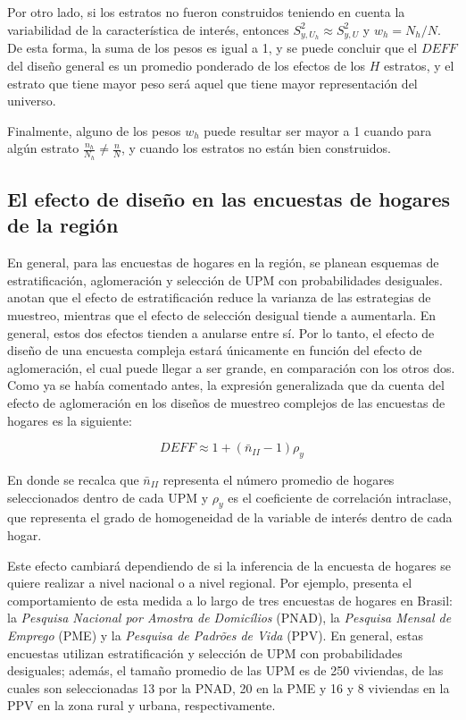 \documentclass[
  12pt,
  spanish,
]{book}
\begin{document}
Por otro lado, si los estratos no fueron construidos teniendo en cuenta la variabilidad de la característica de interés, entonces \(S_{y,U_h}^2\approx S_{y,U}^2\) y \(w_h=N_h/N\). De esta forma, la suma de los pesos es igual a 1, y se puede concluir que el \(DEFF\) del diseño general es un promedio ponderado de los efectos de los \(H\) estratos, y el estrato que tiene mayor peso será aquel que tiene mayor representación del universo.

Finalmente, alguno de los pesos \(w_h\) puede resultar ser mayor a 1 cuando para algún estrato \(\frac{n_h}{N_h}\neq\frac{n}{N}\), y cuando los estratos no están bien construidos.

\hypertarget{el-efecto-de-diseuxf1o-en-las-encuestas-de-hogares-de-la-regiuxf3n}{%
\subsection*{El efecto de diseño en las encuestas de hogares de la región}\label{el-efecto-de-diseuxf1o-en-las-encuestas-de-hogares-de-la-regiuxf3n}}

En general, para las encuestas de hogares en la región, se planean esquemas de estratificación, aglomeración y selección de UPM con probabilidades desiguales. \citet{Heeringa_West_Berglund_2017} anotan que el efecto de estratificación reduce la varianza de las estrategias de muestreo, mientras que el efecto de selección desigual tiende a aumentarla. En general, estos dos efectos tienden a anularse entre sí. Por lo tanto, el efecto de diseño de una encuesta compleja estará únicamente en función del efecto de aglomeración, el cual puede llegar a ser grande, en comparación con los otros dos. Como ya se había comentado antes, la expresión generalizada que da cuenta del efecto de aglomeración en los diseños de muestreo complejos de las encuestas de hogares es la siguiente:

\[
DEFF \approx 1 + (\bar{n}_{II} - 1)\rho_y
\]

En donde se recalca que \(\bar{n}_{II}\) representa el número promedio de hogares seleccionados dentro de cada UPM y \(\rho_y\) es el coeficiente de correlación intraclase, que representa el grado de homogeneidad de la variable de interés dentro de cada hogar.

Este efecto cambiará dependiendo de si la inferencia de la encuesta de hogares se quiere realizar a nivel nacional o a nivel regional. Por ejemplo, \citet[capítulo 7]{United_Nations_2005} presenta el comportamiento de esta medida a lo largo de tres encuestas de hogares en Brasil: la \emph{Pesquisa Nacional por Amostra de Domicílios} (PNAD), la \emph{Pesquisa Mensal de Emprego} (PME) y la \emph{Pesquisa de Padrões de Vida} (PPV). En general, estas encuestas utilizan estratificación y selección de UPM con probabilidades desiguales; además, el tamaño promedio de las UPM es de 250 viviendas, de las cuales son seleccionadas 13 por la PNAD, 20 en la PME y 16 y 8 viviendas en la PPV en la zona rural y urbana, respectivamente.
\end{document}

